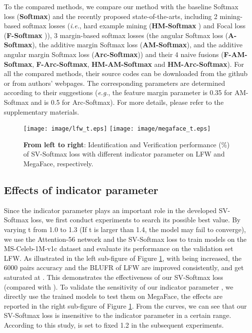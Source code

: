 \documentclass[10pt,twocolumn,letterpaper]{article}
\begin{document}
To the compared methods, we compare our method with the baseline Softmax loss (\textbf{Softmax}) and the recently proposed state-of-the-arts, including 2 mining-based softmax losses (\textit{i.e.}, hard example mining (\textbf{HM-Softmax} \cite{OHEM}) and Focal loss (\textbf{F-Softmax} \cite{Focal})), 3 margin-based softmax losses (the angular Softmax loss (\textbf{A-Softmax}\cite{Angular}), the additive margin Softmax loss (\textbf{AM-Softmax}\cite{AM-Softmax}), and the additive angular margin Softmax loss (\textbf{Arc-Softmax}\cite{Arc-Softmax})) and their 4 naive fusions (\textbf{F-AM-Softmax}, \textbf{F-Arc-Softmax}, \textbf{HM-AM-Softmax} and \textbf{HM-Arc-Softmax}). For all the compared methods, their source codes can be downloaded from the github or from authors' webpages. The corresponding parameters are determined according to their suggestions (\textit{e.g.}, the feature margin parameter  is 0.35 for AM-Softmax and is 0.5 for Arc-Softmax). For more details, please refer to the supplementary materials.

\begin{figure}[t]
\begin{center}
\texttt{[image: image/lfw\_t.eps]}
   \texttt{[image: image/megaface\_t.eps]}
\end{center}
   \caption{\textbf{From left to right}: Identification and Verification performance (\%) of SV-Softmax loss with different indicator parameter  on LFW and MegaFace, respectively. }
\label{fig:parameter}
\end{figure}






\subsection{Effects of indicator parameter }
Since the indicator parameter  plays an important role in the developed SV-Softmax loss, we first conduct experiments to
search its possible best value. By varying t from 1.0 to 1.3 (If t is larger than 1.4, the model may fail to converge), we use the Attention-56 network and the SV-Softmax loss to train models on the MS-Celeb-1M-v1c dataset and evaluate its performance on the validation set LFW. As illustrated in the left sub-figure of Figure \ref{fig:parameter}, with  being increased, the 6000 pairs accuracy and the BLUFR of LFW are improved consistently, and get saturated at . This demonstrates the effectiveness of our SV-Softmax loss (compared  with ). To validate the sensitivity of our indicator parameter , we directly use the trained models to test them on MegaFace, the effects are reported in the right sub-figure of Figure \ref{fig:parameter}. From the curves, we can see that our SV-Softmax loss is insensitive to the indicator parameter  in a certain range. According to this study,  is set to fixed 1.2 in the subsequent experiments.
\end{document}
